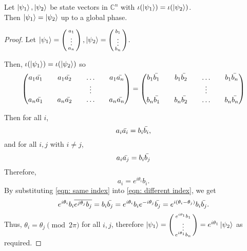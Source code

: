 \begin{lemma}
\label{lemma state into density}
Let $\ket{\psi_1}, \ket{\psi_2}$ be state vectors in ${\mathbb{C}}^n$ with $\iota({\ket{\psi_1}})=\iota(\ket{\psi_2})$.\\
Then $\ket{\psi_1}=\ket{\psi_2}$ up to a global phase.
\end{lemma}
\begin{proof}
Let $\ket{\psi_1}=\left(\begin{smallmatrix}a_1\\ \vdots \\ a_n\end{smallmatrix}\right), \ket{\psi_2}=\left(\begin{smallmatrix}b_1\\ \vdots \\ b_n\end{smallmatrix}\right)$. 
\bigskip

Then, $\iota({\ket{\psi_1}})=\iota(\ket{\psi_2})$ so
\begin{equation*}
\begin{pmatrix}
a_1 \Bar{a_1} && a_1 \Bar{a_2} && \hdots && a_1 \Bar{a_n}\\
&& && \vdots && \\
a_n \Bar{a_1} && a_n \Bar{a_2} && \hdots && a_n \Bar{a_n}\\              
\end{pmatrix}=\begin{pmatrix}
b_1 \Bar{b_1} && b_1 \Bar{b_2} && \hdots && b_1 \Bar{b_n}\\
&& && \vdots && \\
b_n \Bar{b_1} && b_n \Bar{b_2} && \hdots && b_n \Bar{b_n}\\ 
\end{pmatrix}
\end{equation*}

\noindent
Then for all $i$, $$a_i \Bar{a_i}=b_i \Bar{b_i},$$
and for all $i, j$ with $i \ne j$, 
\begin{equation}\label{eqn: different index}
    a_i \Bar{a_j}=b_i \Bar{b_j}
\end{equation}
Therefore, 
\begin{equation}\label{eqn: same index}
   a_i=e^{i\theta_i}b_i. 
\end{equation}
By substituting \eqref{eqn: same index} into \eqref{eqn: different index}, we get 
\begin{equation}
    e^{i\theta_i}b_i \overline{e^{j\theta_j}b_j}=b_i \Bar{b_j}
=e^{i\theta_i}b_i e^{-i\theta_j}\Bar{b_j}=e^{i(\theta_i-\theta_j)}b_i \Bar{b_j}.
\end{equation}
Thus, $\theta_i=\theta_j \pmod{2\pi}$ for all $i,j$, 
therefore $\ket{\psi_1}=\left(\begin{smallmatrix}e^{i\theta_1}b_1 \\ \vdots \\ e^{i\theta_1}b_n\end{smallmatrix}\right)=e^{i\theta_1}\ket{\psi_2}$ as required.
\end{proof}

